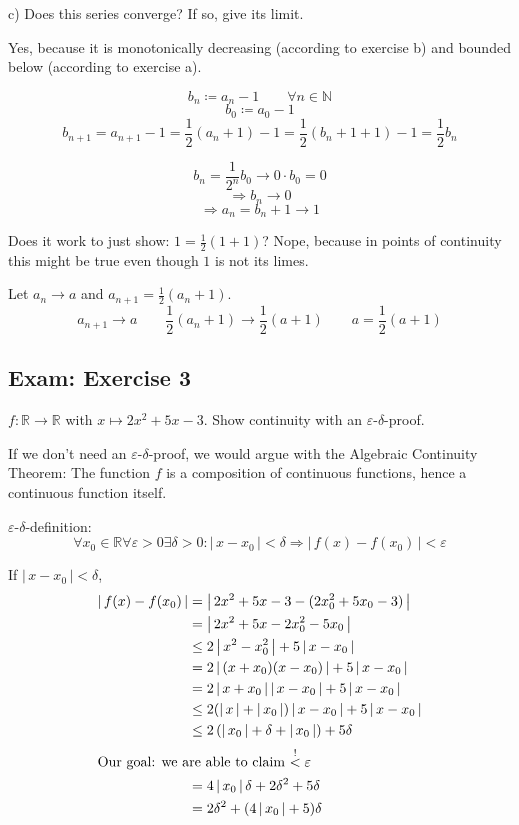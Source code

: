 \documentclass[a4paper]{article}
\theoremstyle{definition}
\newcommand\abs[1]{\left|\,#1\,\right|}
\begin{document}
\begin{ex}
  c) Does this series converge? If so, give its limit.
\end{ex}

Yes, because it is monotonically decreasing (according to exercise b)
and bounded below (according to exercise a).

\[ b_n \coloneqq a_n - 1 \qquad \forall n \in \mathbb N \]
\[ b_0 \coloneqq a_0 - 1 \]
\[ b_{n+1} = a_{n+1} - 1 = \frac12 (a_n + 1) - 1 = \frac12 (b_n + 1 + 1) - 1 = \frac12 b_n \]

\[ b_n = \frac1{2^n} b_0 \to 0 \cdot b_0 = 0 \]
\[ \Rightarrow b_n \to 0 \]
\[ \Rightarrow a_n = b_n + 1 \to 1 \]


Does it work to just show: $1 = \frac12 (1 + 1)$?
Nope, because in points of continuity this might be true even though $1$ is not its limes.

Let $a_n \to a$ and $a_{n+1} = \frac12 (a_n + 1)$.
\[ a_{n+1} \to a \qquad \frac12 (a_n + 1) \to \frac12 (a + 1) \qquad a = \frac12 (a + 1) \]

\subsection{Exam: Exercise 3}
\begin{ex}
  $f: \mathbb R \to \mathbb R$ with $x \mapsto 2x^2 + 5x- 3$.
  Show continuity with an $\varepsilon$-$\delta$-proof.
\end{ex}

If we don't need an $\varepsilon$-$\delta$-proof, we would argue with the Algebraic Continuity Theorem:
The function $f$ is a composition of continuous functions, hence a continuous function itself.

$\varepsilon$-$\delta$-definition:
\[
  \forall x_0 \in \mathbb R \forall \varepsilon > 0 \exists \delta > 0:
  \abs{x - x_0} < \delta \Rightarrow \abs{f(x) - f(x_0)} < \varepsilon
\]

If $\abs{x - x_0} < \delta$,
\begin{align*}
  \abs{f(x) - f(x_0)} &= \abs{2x^2 + 5x - 3 - (2x_0^2 + 5x_0 - 3)} \\
    &= \abs{2x^2 + 5x - 2x_0^2 - 5x_0} \\
    &\leq 2 \abs{x^2 - x_0^2} + 5 \abs{x - x_0} \\
    &= 2 \abs{(x + x_0) (x - x_0)} + 5 \abs{x - x_0} \\
    &= 2 \abs{x + x_0} \abs{x - x_0} + 5 \abs{x - x_0} \\
    &\leq 2 (\abs{x} + \abs{x_0}) \abs{x - x_0} + 5 \abs{x - x_0} \\
    &\leq 2 \left(\abs{x_0} + \delta + \abs{x_0}\right) + 5 \delta \\
  \intertext{Our goal: we are able to claim $\stackrel!{<} \varepsilon$}
    &= 4 \abs{x_0} \delta + 2 \delta^2 + 5 \delta \\
    &= 2\delta^2 + (4 \abs{x_0} + 5) \delta
\end{align*}
\end{document}
